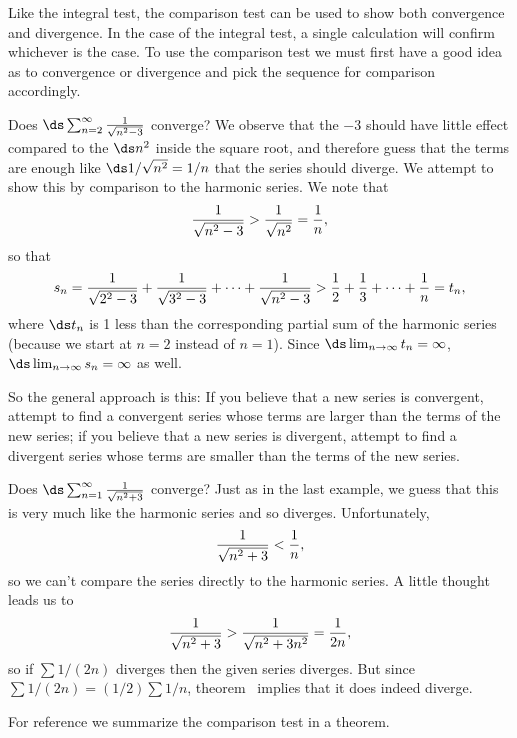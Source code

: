 Like the integral test, the comparison test can be used to show both
convergence and divergence. In the case of the integral test, a single
calculation will confirm whichever is the case. To use the comparison
test we must first have a good idea as to convergence or divergence
and pick the sequence for comparison accordingly.

\begin{example} Does $\ds\sum_{n=2}^\infty {1\over\sqrt{n^2-3}}$ converge?
\ssk
We observe that the $-3$ should have little effect compared to the
$\ds n^2$ inside the square root, and therefore guess that the terms are
enough like $\ds 1/\sqrt{n^2}=1/n$ that the series should diverge. We
attempt to show this by comparison to the harmonic series. We note
that 
$${1\over\sqrt{n^2-3}} > {1\over\sqrt{n^2}} = {1\over n},$$
so that
$$
  s_n={1\over\sqrt{2^2-3}}+{1\over\sqrt{3^2-3}}+\cdots+
  {1\over\sqrt{n^2-3}} > {1\over 2} + {1\over3}+\cdots+{1\over n}=t_n,
$$
where $\ds t_n$ is 1 less than the corresponding partial sum of the
harmonic series (because we start at $n=2$ instead of $n=1$). Since
$\ds\lim_{n\to\infty}t_n=\infty$, $\ds\lim_{n\to\infty}s_n=\infty$ as
well.
\end{example}

So the general approach is this: If you believe that a new series is
convergent, attempt to find a convergent series whose terms are
larger than the terms of the new series; if you believe that a new
series is divergent, attempt to find a divergent series whose terms
are smaller than the terms of the new series.

\begin{example} Does $\ds\sum_{n=1}^\infty {1\over\sqrt{n^2+3}}$ converge?
\ssk
Just as in the last example, we guess that this is very much like the
harmonic series and so diverges. Unfortunately,
$${1\over\sqrt{n^2+3}} < {1\over n},$$
so we can't compare the series directly to the harmonic series.
A little thought leads us to
$${1\over\sqrt{n^2+3}} > {1\over\sqrt{n^2+3n^2}} = {1\over2n},$$ so if
$\sum 1/(2n)$ diverges then the given series diverges. But since $\sum
1/(2n)=(1/2)\sum 1/n$, theorem~ implies
that it does indeed diverge.
\end{example}

For reference we summarize the comparison test in a theorem.

